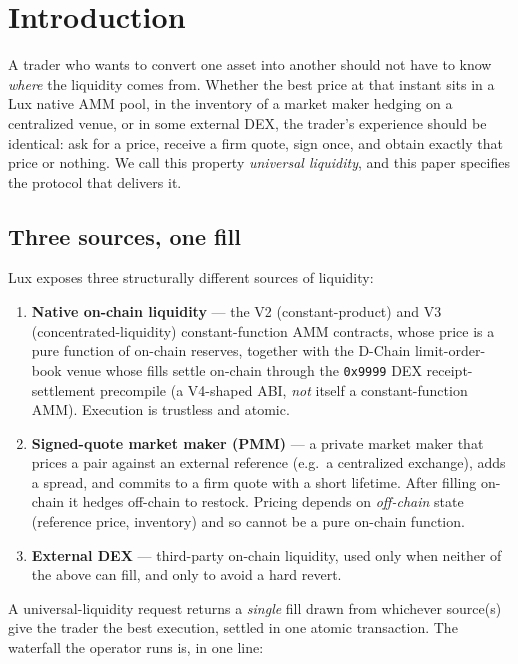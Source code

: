 \section{Introduction}
\label{sec:intro}

A trader who wants to convert one asset into another should not have to
know \emph{where} the liquidity comes from. Whether the best price at
that instant sits in a Lux native AMM pool, in the inventory of a
market maker hedging on a centralized venue, or in some external DEX,
the trader's experience should be identical: ask for a price, receive a
firm quote, sign once, and obtain exactly that price or nothing. We
call this property \emph{universal liquidity}, and this paper specifies
the protocol that delivers it.

\subsection{Three sources, one fill}

Lux exposes three structurally different sources of liquidity:

\begin{enumerate}[label=(\roman*)]
  \item \textbf{Native on-chain liquidity} --- the V2 (constant-product)
  and V3 (concentrated-liquidity) constant-function AMM contracts, whose
  price is a pure function of on-chain reserves, together with the
  D-Chain limit-order-book venue whose fills settle on-chain through the
  \texttt{0x9999} DEX receipt-settlement precompile (a V4-shaped ABI,
  \emph{not} itself a constant-function AMM). Execution is trustless and
  atomic.

  \item \textbf{Signed-quote market maker (PMM)} --- a private market
  maker that prices a pair against an external reference (e.g.\ a
  centralized exchange), adds a spread, and commits to a firm quote
  with a short lifetime. After filling on-chain it hedges off-chain to
  restock. Pricing depends on \emph{off-chain} state (reference price,
  inventory) and so cannot be a pure on-chain function.

  \item \textbf{External DEX} --- third-party on-chain liquidity, used
  only when neither of the above can fill, and only to avoid a hard
  revert.
\end{enumerate}

A universal-liquidity request returns a \emph{single} fill drawn from
whichever source(s) give the trader the best execution, settled in one
atomic transaction. The waterfall the operator runs is, in one line:

